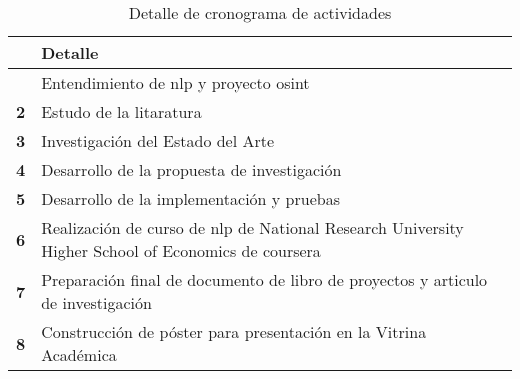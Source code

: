 \begin{table}[h!]
\begin{center}
\begin{tabular}{|>{\centering\arraybackslash}p{}|p{}|} \hline
  & \textbf{Detalle} \\ \hline
  {\bf 1} & Entendimiento de \gls{nlp} y proyecto \gls{osint} \\ \hline
  
  {\bf 2} & Estudo de la litaratura \\ \hline
  
  {\bf 3} & Investigación del Estado del Arte \\ \hline
  
  {\bf 4} & Desarrollo de la propuesta de investigación \\ \hline
  
  {\bf 5} & Desarrollo de la implementación y pruebas \\ \hline
  
  {\bf 6} & Realización de curso de \gls{nlp} de National Research University Higher School of Economics
            de \gls{coursera} \\ \hline
  
  {\bf 7} & Preparación final de documento de libro de proyectos y articulo de investigación \\ \hline
  
  {\bf 8} & Construcción de póster para presentación en la Vitrina Académica \\ \hline
\end{tabular}
\end{center}
\caption{Detalle de cronograma de actividades}
\label{table:schedule}
\end{table}